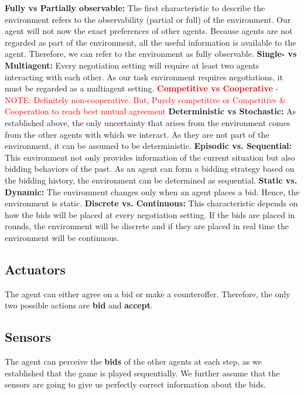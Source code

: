 \documentclass[a4paper,11pt]{article}
\theoremstyle{mytheor}
\begin{document}
\textbf{Fully vs Partially observable:} The first characteristic to describe the environment refers to the observability (partial or full) of the environment. Our agent will not now the exact preferences of other agents. Because agents are not regarded as part of the environment, all the useful information is available to the agent. Therefore, we can refer to the environment as fully observable.
\textbf{Single- vs Multiagent:} Every negotiation setting will require at least two agents interacting with each other. As our task environment requires negotiations, it must be regarded as a multiagent setting.
\textcolor{red}{\textbf{Competitive vs Cooperative}
-NOTE: Definitely non-cooperative. But, Purely competitive or Competitive & Cooperation to reach best mutual agreement}
\textbf{Deterministic vs Stochastic:}
As established above, the only uncertainty that arises from the environment comes from the other agents with which we interact. As they are not part of the environment, it can be assumed to be deterministic. 
\textbf{Episodic vs. Sequential:} This environment not only provides information of the current situation but also bidding behaviors of the past. As an agent can form a bidding strategy based on the bidding history, the environment can be determined as sequential. 
\textbf{Static vs. Dynamic:} The environment changes only when an agent places a bid. Hence, the environment is static.
\textbf{Discrete vs. Continuous:} This characteristic depends on how the bids will be placed at every negotiation setting. If the bids are placed in rounds, the environment will be discrete and if they are placed in real time the environment will be continuous.
\textbf{}
\subsection{Actuators}
The agent can either agree on a bid or make a counteroffer. Therefore, the only two possible actions are \textbf{bid} and \textbf{accept}.

\subsection{Sensors}
The agent can perceive the \textbf{bids} of the other agents at each step, as we established that the game is played sequentially. We further assume that the sensors are going to give us perfectly correct information about the bids. 
\end{document}
